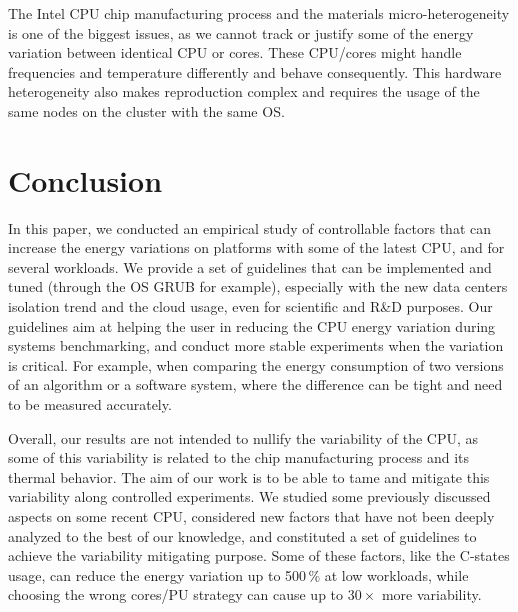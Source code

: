 The Intel CPU chip manufacturing process and the materials micro-heterogeneity is one of the biggest issues, as we cannot track or justify some of the energy variation between identical CPU or cores.
These CPU/cores might handle frequencies and temperature differently and behave consequently.
This hardware heterogeneity also makes reproduction complex and requires the usage of the same nodes on the cluster with the same OS.



\section{Conclusion}\label{sec:conclusion}
In this paper, we conducted an empirical study of controllable factors that can increase the energy variations on platforms with some of the latest CPU, and for several workloads.
We provide a set of guidelines that can be implemented and tuned (through the OS GRUB for example), especially with the new data centers isolation trend and the cloud usage, even for scientific and R\&D purposes.
Our guidelines aim at helping the user in reducing the CPU energy variation during systems benchmarking, and conduct more stable experiments when the variation is critical.
For example, when comparing the energy consumption of two versions of an algorithm or a software system, where the difference can be tight and need to be measured accurately.

Overall, our results are not intended to nullify the variability of the CPU, as some of this variability is related to the chip manufacturing process and its thermal behavior.
The aim of our work is to be able to tame and mitigate this variability along controlled experiments.
We studied some previously discussed aspects on some recent CPU, considered new factors that have not been deeply analyzed to the best of our knowledge, and constituted a set of guidelines to achieve the variability mitigating purpose.
Some of these factors, like the C-states usage, can reduce the energy variation up to 500\,\% at low workloads, while choosing the wrong cores/PU strategy can cause up to $30\times$ more variability.


